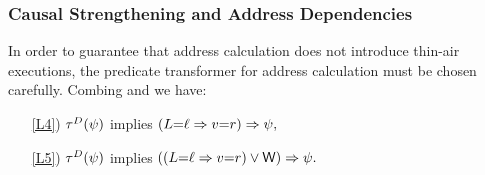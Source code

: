 \subsubsection*{Causal Strengthening and Address Dependencies}
\begin{scope}
  In order to guarantee that address calculation does not introduce thin-air
  executions, the predicate transformer for address calculation must be
  chosen carefully.
  Combing  and  we have:

  \begin{enumerate}
    
  \item[\ref{L4})]
    $\aTr{\bEvs}{\bForm}$ implies
    \begin{math}
      (L{=}\ell\Rightarrow v{=}r)\Rightarrow\psi,
    \end{math}
  \item[\ref{L5})]
    $\aTr{\cEvs}{\bForm}$ implies
    \begin{math}
      ((L{=}\ell\Rightarrow v{=}r)\lor\mathsf{W})\Rightarrow\psi.
    \end{math}
  \end{enumerate}  
  

\end{scope}
